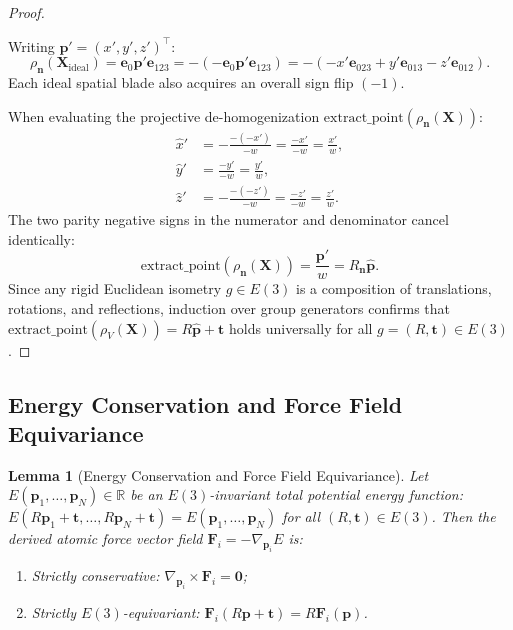 \documentclass[10pt]{article}
\newtheorem{lemma}{Lemma}
\begin{document}
\begin{proof}
\begin{itemize}
    Writing $\mathbf{p}' = (x', y', z')^\top$:
    \begin{equation}
        \rho_{\mathbf{n}}(\mathbf{X}_{\text{ideal}}) = \mathbf{e}_0 \mathbf{p}' \mathbf{e}_{123} = -(-\mathbf{e}_0 \mathbf{p}' \mathbf{e}_{123}) = -(-x' \mathbf{e}_{023} + y' \mathbf{e}_{013} - z' \mathbf{e}_{012}).
    \end{equation}
    Each ideal spatial blade also acquires an overall sign flip $(-1)$.
\end{itemize}
When evaluating the projective de-homogenization $\mathrm{extract\_point}(\rho_{\mathbf{n}}(\mathbf{X}))$:
\begin{align}
    \hat{x}' &= -\frac{-(-x')}{-w} = \frac{-x'}{-w} = \frac{x'}{w}, \nonumber \\
    \hat{y}' &= \frac{-y'}{-w} = \frac{y'}{w}, \nonumber \\
    \hat{z}' &= -\frac{-(-z')}{-w} = \frac{-z'}{-w} = \frac{z'}{w}.
\end{align}
The two parity negative signs in the numerator and denominator cancel identically:
\begin{equation}
    \mathrm{extract\_point}(\rho_{\mathbf{n}}(\mathbf{X})) = \frac{\mathbf{p}'}{w} = R_{\mathbf{n}} \hat{\mathbf{p}}.
\end{equation}
Since any rigid Euclidean isometry $g \in E(3)$ is a composition of translations, rotations, and reflections, induction over group generators confirms that $\mathrm{extract\_point}(\rho_V(\mathbf{X})) = R \hat{\mathbf{p}} + \mathbf{t}$ holds universally for all $g = (R, \mathbf{t}) \in E(3)$.
\end{proof}

\subsection{Energy Conservation and Force Field Equivariance}

\begin{lemma}[Energy Conservation and Force Field Equivariance]
\label{lem:force_conservation}
Let $E(\mathbf{p}_1, \dots, \mathbf{p}_N) \in \mathbb{R}$ be an $E(3)$-invariant total potential energy function: $E(R\mathbf{p}_1 + \mathbf{t}, \dots, R\mathbf{p}_N + \mathbf{t}) = E(\mathbf{p}_1, \dots, \mathbf{p}_N)$ for all $(R, \mathbf{t}) \in E(3)$. 
Then the derived atomic force vector field $\mathbf{F}_i = -\nabla_{\mathbf{p}_i} E$ is:
\begin{enumerate}
    \item Strictly conservative: $\nabla_{\mathbf{p}_i} \times \mathbf{F}_i = \mathbf{0}$;
    \item Strictly $E(3)$-equivariant: $\mathbf{F}_i(R\mathbf{p} + \mathbf{t}) = R \mathbf{F}_i(\mathbf{p})$.
\end{enumerate}
\end{lemma}
\end{document}
